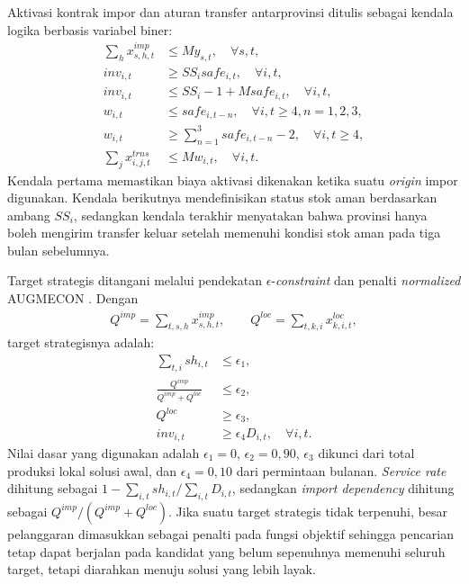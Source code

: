 \documentclass[journal]{IEEEtran}
\theoremstyle{definition}
\theoremstyle{definition}
\theoremstyle{plain}
\begin{document}
    Aktivasi kontrak impor dan aturan transfer antarprovinsi ditulis sebagai kendala logika berbasis variabel biner:
    \begin{align}
    \sum_h x^{imp}_{s,h,t} &\leq M y_{s,t}, \quad \forall s,t, \\
    inv_{i,t} &\geq SS_i safe_{i,t}, \quad \forall i,t, \\
    inv_{i,t} &\leq SS_i-1+M safe_{i,t}, \quad \forall i,t, \\
    w_{i,t} &\leq safe_{i,t-n}, \quad \forall i,t\geq4,n=1,2,3, \\
    w_{i,t} &\geq \sum_{n=1}^{3}safe_{i,t-n}-2, \quad \forall i,t\geq4, \\
    \sum_j x^{trns}_{i,j,t} &\leq Mw_{i,t}, \quad \forall i,t.
    \end{align}
    Kendala pertama memastikan biaya aktivasi dikenakan ketika suatu \textit{origin} impor digunakan. Kendala berikutnya mendefinisikan status stok aman berdasarkan ambang $SS_i$, sedangkan kendala terakhir menyatakan bahwa provinsi hanya boleh mengirim transfer keluar setelah memenuhi kondisi stok aman pada tiga bulan sebelumnya.

    Target strategis ditangani melalui pendekatan $\epsilon$-\textit{constraint} dan penalti \textit{normalized} AUGMECON \cite{MAVROTAS_EPSILON}. Dengan
    \begin{align}
    Q^{imp}=\sum_{t,s,h}x^{imp}_{s,h,t}, \qquad
    Q^{loc}=\sum_{t,k,i}x^{loc}_{k,i,t},
    \end{align}
    target strategisnya adalah:
    \begin{align}
    \sum_{t,i} sh_{i,t} &\leq \epsilon_1, \\
    \frac{Q^{imp}}{Q^{imp}+Q^{loc}} &\leq \epsilon_2, \\
    Q^{loc} &\geq \epsilon_3, \\
    inv_{i,t} &\geq \epsilon_4D_{i,t}, \quad \forall i,t.
    \end{align}
    Nilai dasar yang digunakan adalah $\epsilon_1=0$, $\epsilon_2=0,90$, $\epsilon_3$ dikunci dari total produksi lokal solusi awal, dan $\epsilon_4=0,10$ dari permintaan bulanan. \textit{Service rate} dihitung sebagai $1-\sum_{i,t}sh_{i,t}/\sum_{i,t}D_{i,t}$, sedangkan \textit{import dependency} dihitung sebagai $Q^{imp}/(Q^{imp}+Q^{loc})$. Jika suatu target strategis tidak terpenuhi, besar pelanggaran dimasukkan sebagai penalti pada fungsi objektif sehingga pencarian tetap dapat berjalan pada kandidat yang belum sepenuhnya memenuhi seluruh target, tetapi diarahkan menuju solusi yang lebih layak.
\end{document}
